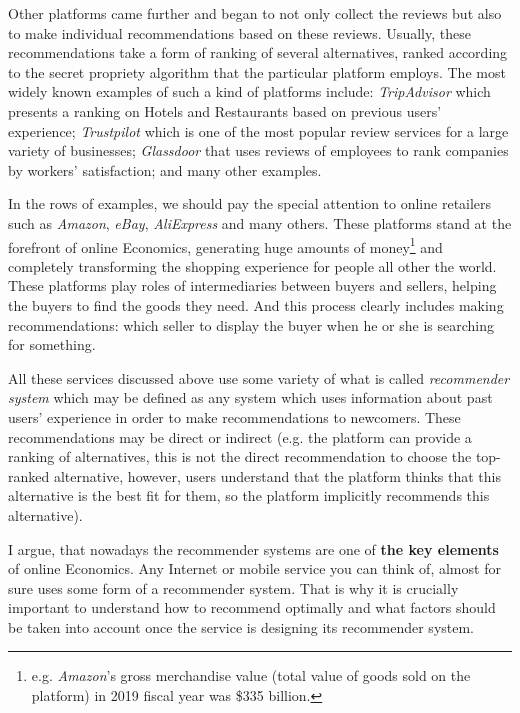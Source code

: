 \documentclass[a4paper]{article}
\begin{document}
	
	
	
	
Other platforms came further and began to not only collect the reviews but also to make individual recommendations based on these reviews. Usually, these recommendations take a form of ranking of several alternatives, ranked according to the secret propriety algorithm that the particular platform employs. The most widely known examples of such a kind of platforms include: \textit{TripAdvisor} which presents a ranking on Hotels and Restaurants based on previous users' experience; \textit{Trustpilot} which is one of the most popular review services for a large variety of businesses; \textit{Glassdoor} that uses reviews of employees to rank companies by workers' satisfaction; and many other examples. 
	
	
	
	
In the rows of examples, we should pay the special attention to online retailers such as \textit{Amazon}, \textit{eBay}, \textit{AliExpress} and many others. These platforms stand at the forefront of online Economics, generating huge amounts of money\footnote{e.g. \textit{Amazon}'s gross merchandise value (total value of goods sold on the platform) in 2019 fiscal year was \$335 billion.} and completely transforming the shopping experience for people all other the world. These platforms play roles of intermediaries between buyers and sellers, helping the buyers to find the goods they need. And this process clearly includes making recommendations: which seller to display the buyer when he or she is searching for something.	
	
	
	All these services discussed above use some variety of what is called \textit{recommender system} which may be defined as any system which uses information about past users' experience in order to make recommendations to newcomers. These recommendations may be direct or indirect (e.g. the platform can provide a ranking of alternatives, this is not the direct recommendation to choose the top-ranked alternative, however, users understand that the platform thinks that this alternative is the best fit for them, so the platform implicitly recommends this alternative). 
	
	
	
	
	
I argue, that nowadays the recommender systems are one of \textbf{the key elements} of online Economics. Any Internet or mobile service you can think of, almost for sure uses some form of a recommender system. That is why it is crucially important to understand how to recommend optimally and what factors should be taken into account once the service is designing its recommender system.
	
\end{document}
